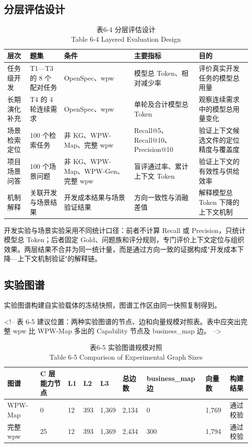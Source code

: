 \subsection{分层评估设计}
\begin{table}[htbp]
\centering
\small
\caption{表6-4 分层评估设计\\Table 6-4 Layered Evaluation Design}
\begin{tabularx}{\textwidth}{|X|X|X|X|X|}
\hline
\textbf{层次} & \textbf{题集} & \textbf{条件} & \textbf{主要指标} & \textbf{目的} \\
\hline
任务级开发 & T1—T3 的 8 个配对任务 & OpenSpec、wpw & 模型总 Token、相对减少率 & 评价真实开发任务的模型总用量 \\
长期演化补充 & T4 的 4 轮连续需求 & OpenSpec、wpw & 单轮及合计模型总 Token & 观察连续需求中的模型总用量变化 \\
场景检索定位 & 100 个检索任务 & 非 KG、WPW-Map、完整 wpw & Recall@5、Recall@10、Precision@10 & 验证上下文候选文件的定位精度与覆盖度 \\
项目场景问答 & 100 个场景问题 & 非 KG、WPW-Map、WPW-Gen、完整 wpw & 盲评通过率、累计上下文 Token & 验证上下文的有效性与供给效率 \\
机制解释 & 关联开发与场景结果 & 开发成本结果与场景验证结果 & 方向一致性与消融差值 & 解释模型总 Token 下降的上下文机制 \\
\hline
\end{tabularx}
\end{table}

开发实验与场景实验采用不同统计口径：前者不计算 Recall 或 Precision，只统计模型总 Token；后者固定 Gold、问题族和评分规则，专门评价上下文定位与组织效果。两层结果不合并为同一统计量，而是通过方向一致的证据构成"开发成本下降—上下文机制验证"的解释链。


\subsection{实验图谱}
实验图谱构建自实验载体的冻结快照，图谱工作区由同一快照复制得到。

<!-- 表 6-5 建议位置：两种实验图谱的节点、边和向量规模对照表。表中应突出完整 wpw 比 WPW-Map 多出的 Capability 节点及 business\_map 边。 -->

\begin{table}[htbp]
\centering
\small
\caption{表6-5 实验图谱规模对照\\Table 6-5 Comparison of Experimental Graph Sizes}
\begin{tabularx}{\textwidth}{|X|X|X|X|X|X|X|X|X|}
\hline
\textbf{图谱} & \textbf{C 层能力节点} & \textbf{L1} & \textbf{L2} & \textbf{L3} & \textbf{总边数} & \textbf{business\_map 边} & \textbf{向量数} & \textbf{构建结果} \\
\hline
WPW-Map & 0 & 12 & 393 & 1,369 & 2,134 & 0 & 1,769 & 通过校验 \\
完整 wpw & 25 & 12 & 393 & 1,369 & 2,434 & 300 & 1,794 & 通过校验 \\
\hline
\end{tabularx}
\end{table}

